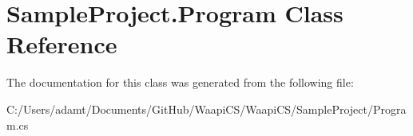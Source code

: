 \hypertarget{class_sample_project_1_1_program}{}\section{Sample\+Project.\+Program Class Reference}
\label{class_sample_project_1_1_program}


The documentation for this class was generated from the following file\+:\begin{DoxyCompactItemize}
\item 
C\+:/\+Users/adamt/\+Documents/\+Git\+Hub/\+Waapi\+C\+S/\+Waapi\+C\+S/\+Sample\+Project/Program.\+cs\end{DoxyCompactItemize}
